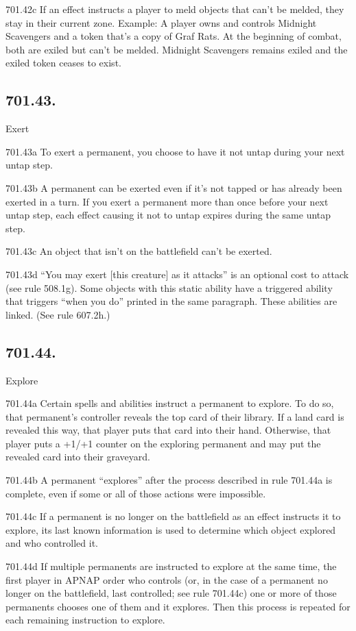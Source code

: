 701.42c If an effect instructs a player to meld objects that can’t be melded, they stay in their current zone.
Example: A player owns and controls Midnight Scavengers and a token that’s a copy of Graf Rats. At the beginning of combat, both are exiled but can’t be melded. Midnight Scavengers remains exiled and the exiled token ceases to exist.

\subsection*{701.43.}
Exert

701.43a To exert a permanent, you choose to have it not untap during your next untap step.

701.43b A permanent can be exerted even if it’s not tapped or has already been exerted in a turn. If you exert a permanent more than once before your next untap step, each effect causing it not to untap expires during the same untap step.

701.43c An object that isn’t on the battlefield can’t be exerted.

701.43d “You may exert [this creature] as it attacks” is an optional cost to attack (see rule 508.1g). Some objects with this static ability have a triggered ability that triggers “when you do” printed in the same paragraph. These abilities are linked. (See rule 607.2h.)

\subsection*{701.44.}
Explore

701.44a Certain spells and abilities instruct a permanent to explore. To do so, that permanent’s controller reveals the top card of their library. If a land card is revealed this way, that player puts that card into their hand. Otherwise, that player puts a +1/+1 counter on the exploring permanent and may put the revealed card into their graveyard.

701.44b A permanent “explores” after the process described in rule 701.44a is complete, even if some or all of those actions were impossible.

701.44c If a permanent is no longer on the battlefield as an effect instructs it to explore, its last known information is used to determine which object explored and who controlled it.

701.44d If multiple permanents are instructed to explore at the same time, the first player in APNAP order who controls (or, in the case of a permanent no longer on the battlefield, last controlled; see rule 701.44c) one or more of those permanents chooses one of them and it explores. Then this process is repeated for each remaining instruction to explore.

